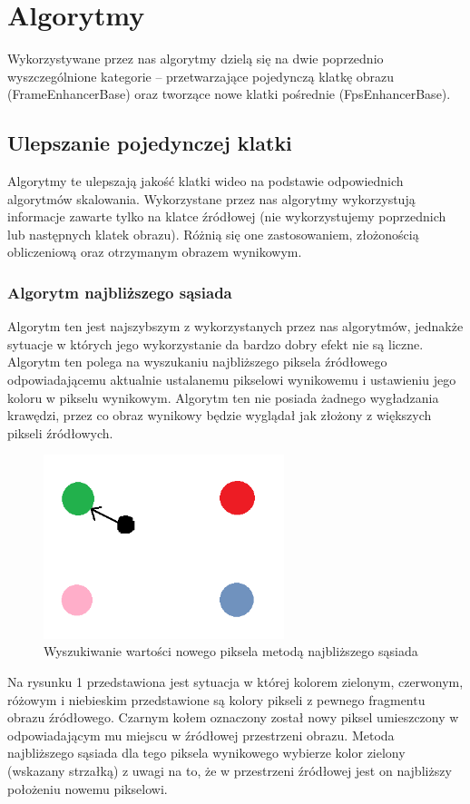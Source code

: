 \documentclass[twoside]{projektInzynierskiMS}
\begin{document}
\section{Algorytmy}
Wykorzystywane przez nas algorytmy dzielą się na dwie poprzednio wyszczególnione kategorie -- przetwarzające pojedynczą klatkę obrazu (FrameEnhancerBase) oraz tworzące nowe klatki pośrednie (FpsEnhancerBase). 

\subsection{Ulepszanie pojedynczej klatki}
Algorytmy te ulepszają jakość klatki wideo na podstawie odpowiednich algorytmów skalowania. Wykorzystane przez nas algorytmy wykorzystują informacje zawarte tylko na klatce źródłowej (nie wykorzystujemy poprzednich lub następnych klatek obrazu). Różnią się one zastosowaniem, złożonością obliczeniową oraz otrzymanym obrazem wynikowym.

\subsubsection{Algorytm najbliższego sąsiada}
Algorytm ten jest najszybszym z wykorzystanych przez nas algorytmów, jednakże sytuacje w których jego wykorzystanie da bardzo dobry efekt nie są liczne. Algorytm ten polega na wyszukaniu najbliższego piksela źródłowego odpowiadającemu aktualnie ustalanemu pikselowi wynikowemu i ustawieniu jego koloru w pikselu wynikowym. Algorytm ten nie posiada żadnego wygładzania krawędzi, przez co obraz wynikowy będzie wyglądał jak złożony z większych pikseli źródłowych. 

\begin{figure}[h]
\centering
\includegraphics[width=7cm]{NN.png}
\caption{Wyszukiwanie wartości nowego piksela metodą najbliższego sąsiada}
\end{figure}

Na rysunku 1 przedstawiona jest sytuacja w której kolorem zielonym, czerwonym, różowym i niebieskim przedstawione są kolory pikseli z pewnego fragmentu obrazu źródłowego. Czarnym kołem oznaczony został nowy piksel umieszczony w odpowiadającym mu miejscu w źródłowej przestrzeni obrazu. Metoda najbliższego sąsiada dla tego piksela wynikowego wybierze kolor zielony (wskazany strzałką) z uwagi na to, że w przestrzeni źródłowej jest on najbliższy położeniu nowemu pikselowi.
\end{document}
